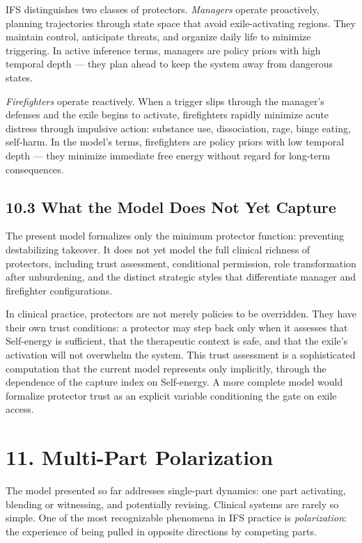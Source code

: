 \documentclass[11pt]{article}
\begin{document}
IFS distinguishes two classes of protectors. \emph{Managers} operate
proactively, planning trajectories through state space that avoid
exile-activating regions. They maintain control, anticipate threats, and
organize daily life to minimize triggering. In active inference terms,
managers are policy priors with high temporal depth --- they plan ahead
to keep the system away from dangerous states.

\emph{Firefighters} operate reactively. When a trigger slips through the
manager's defenses and the exile begins to activate, firefighters
rapidly minimize acute distress through impulsive action: substance use,
dissociation, rage, binge eating, self-harm. In the model's terms,
firefighters are policy priors with low temporal depth --- they minimize
immediate free energy without regard for long-term consequences.

\subsection{10.3 What the Model Does Not Yet
Capture}\label{what-the-model-does-not-yet-capture}

The present model formalizes only the minimum protector function:
preventing destabilizing takeover. It does not yet model the full
clinical richness of protectors, including trust assessment, conditional
permission, role transformation after unburdening, and the distinct
strategic styles that differentiate manager and firefighter
configurations.

In clinical practice, protectors are not merely policies to be
overridden. They have their own trust conditions: a protector may step
back only when it assesses that Self-energy is sufficient, that the
therapeutic context is safe, and that the exile's activation will not
overwhelm the system. This trust assessment is a sophisticated
computation that the current model represents only implicitly, through
the dependence of the capture index on Self-energy. A more complete
model would formalize protector trust as an explicit variable
conditioning the gate on exile access.

\section{11. Multi-Part Polarization}\label{multi-part-polarization}

The model presented so far addresses single-part dynamics: one part
activating, blending or witnessing, and potentially revising. Clinical
systems are rarely so simple. One of the most recognizable phenomena in
IFS practice is \emph{polarization}: the experience of being pulled in
opposite directions by competing parts.
\end{document}
